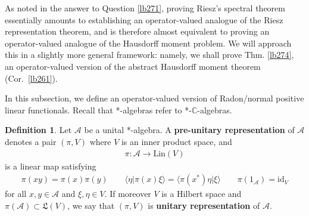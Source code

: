 \documentclass[12pt,b5paper,notitlepage]{article}
\theoremstyle{definition}
\newtheorem{df}{Definition}[subsection]
\theoremstyle{plain}
\newcommand{\fk}{\mathfrak}
\newcommand{\id}{\mathrm{id}}
\newcommand{\bk}[1]{\langle {#1}\rangle}
\newcommand{\scr}{\mathscr}
\newcommand{\Cbb}{\mathbb C}
\newcommand{\Fbb}{\mathbb F}
\newcommand{\Lin}{\mathrm{Lin}}
\newcommand{\SA}{\mathscr A}
\numberwithin{equation}{section}
\begin{document}
\begin{comment}
\begin{df}
Let $\scr A$ and $\scr B$ be *-$\Fbb$-algebras. A linear map $\varphi:\scr A\rightarrow\scr B$ is called a \textbf{*-homomorphism} \index{00@*-homomorphism} if it satisfies
\begin{align*}
\varphi(xy)=\varphi(x)\varphi(y)\qquad\varphi(x^*)=\varphi(x)^*
\end{align*}
for all $x,y\in\scr A$. If $\scr A$ and $\scr B$ are both unital, a *-homomorphism $\varphi:\scr A\rightarrow\scr B$ is called \textbf{unital} \index{00@Unital *-homomorphism} if
\begin{align*}
\varphi(1_{\scr A})=1_{\scr B}
\end{align*}
\end{df}
\end{comment}


As noted in the answer to Question \ref{lb271}, proving Riesz's spectral theorem essentially amounts to establishing an operator-valued analogue of the Riesz representation theorem, and is therefore almost equivalent to proving an operator-valued analogue of the Hausdorff moment problem. We will approach this in a slightly more general framework: namely, we shall prove Thm. \ref{lb274}, an operator-valued version of the abstract Hausdorff moment theorem (Cor.\ \ref{lb261}).

In this subsection, we define an operator-valued version of Radon/normal positive linear functionals. Recall that *-algebras refer to *-$\Cbb$-algebras.


\begin{df}\label{lb347}
Let $\scr A$ be a unital *-algebra. A \textbf{pre-unitary representation} of $\scr A$  denotes a pair $(\pi,V)$ where $V$ is an inner product space, and
\begin{align*}
\pi:\scr A\rightarrow\Lin(V)
\end{align*}
is a linear map satisfying
\begin{align*}
\pi(xy)=\pi(x)\pi(y)\qquad\bk{\eta|\pi(x)\xi}=\bk{\pi(x^*)\eta|\xi}\qquad\pi(1_{\scr A})=\id_V
\end{align*}
for all $x,y\in\scr A$ and $\xi,\eta\in V$. If moreover $V$ is a Hilbert space and $\pi(\SA)\subset\fk L(V)$, we say that $(\pi,V)$ is \textbf{unitary representation} of $\scr A$. 
\end{df}

\end{document}
